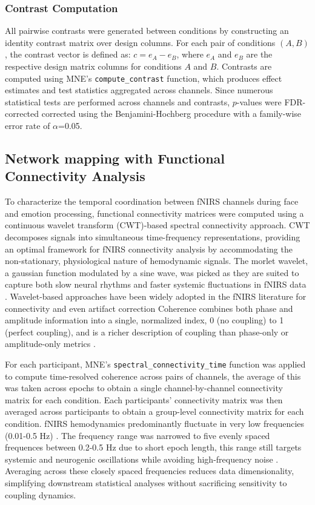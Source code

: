 \subsubsection{Contrast Computation}
\label{sec:contrast_computation}
All pairwise contrasts were generated between conditions by constructing an identity contrast matrix over design columns. 
For each pair of conditions \( (A, B) \), the contrast vector is defined as: $c = e_A - e_B$, where \( e_A \) and \( e_B \) are the respective design matrix columns for conditions \( A \) and \( B \). 
Contrasts are computed using MNE's \texttt{compute\_contrast} function, which produces effect estimates and test statistics aggregated across channels.
Since numerous statistical tests are performed across channels and contrasts, $p$-values were FDR-corrected corrected using the Benjamini-Hochberg procedure \citep{singh_exploring_2006} with a family-wise error rate of $\alpha$=0.05.

\subsection{Network mapping with Functional Connectivity Analysis}
\label{sec:fc}
To characterize the temporal coordination between fNIRS channels during face and emotion processing, functional connectivity matrices were computed using a continuous wavelet transform (CWT)-based spectral connectivity approach.
CWT decomposes signals into simultaneous time-frequency representations, providing an optimal framework for fNIRS connectivity analysis by accommodating the non-stationary, physiological nature of hemodynamic signals. 
The morlet wavelet, a gaussian function modulated by a sine wave, was picked as they are suited to capture both slow neural rhythms and faster systemic fluctuations in fNIRS data \citep{reddy_evaluation_2021}. 
Wavelet-based approaches have been widely adopted in the fNIRS literature for connectivity and even artifact correction \citep{bergmann_evaluation_2023, hakim_quantification_2023}
Coherence combines both phase and amplitude information into a single, normalized index, 0 (no coupling) to 1 (perfect coupling), and is a richer description of coupling than phase-only or amplitude-only metrics \citep{bastos_tutorial_2016}.

For each participant, MNE's \texttt{spectral\_connectivity\_time} function was applied to compute time-resolved coherence across pairs of channels, the average of this was taken across epochs to obtain a single channel-by-channel connectivity matrix for each condition.
Each participants' connectivity matrix was then averaged across participants to obtain a group-level connectivity matrix for each condition. 
fNIRS hemodynamics predominantly fluctuate in very low frequencies (0.01-0.5 Hz) \citep{reddy_evaluation_2021}. 
The frequency range was narrowed to five evenly spaced frequences between 0.2-0.5 Hz due to short epoch length, this range still targets systemic and neurogenic oscillations while avoiding high-frequency noise \citep{xu_functional_2017}.
Averaging across these closely spaced frequencies reduces data dimensionality, simplifying downstream statistical analyses without sacrificing sensitivity to coupling dynamics. 

